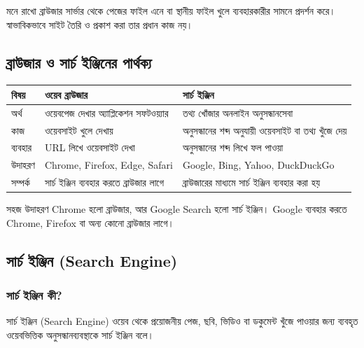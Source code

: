 \begin{boardbox}{মনে রাখো}
ব্রাউজার সার্ভার থেকে পেজের ফাইল এনে বা স্থানীয় ফাইল খুলে ব্যবহারকারীর সামনে প্রদর্শন করে। স্বাভাবিকভাবে সাইট তৈরি ও প্রকাশ করা তার প্রধান কাজ নয়।
\end{boardbox}

\subsection{ব্রাউজার ও সার্চ ইঞ্জিনের পার্থক্য}

\begin{center}
\begin{tabular}{|p{}|p{}|p{}|}
\hline
\textbf{বিষয়} & \textbf{ওয়েব ব্রাউজার} & \textbf{সার্চ ইঞ্জিন} \\
\hline
অর্থ & ওয়েবপেজ দেখার অ্যাপ্লিকেশন সফটওয়্যার & তথ্য খোঁজার অনলাইন অনুসন্ধানসেবা \\
\hline
কাজ & ওয়েবসাইট খুলে দেখায় & অনুসন্ধানের শব্দ অনুযায়ী ওয়েবসাইট বা তথ্য খুঁজে দেয় \\
\hline
ব্যবহার & URL লিখে ওয়েবসাইট দেখা & অনুসন্ধানের শব্দ লিখে ফল পাওয়া \\
\hline
উদাহরণ & Chrome, Firefox, Edge, Safari & Google, Bing, Yahoo, DuckDuckGo \\
\hline
সম্পর্ক & সার্চ ইঞ্জিন ব্যবহার করতে ব্রাউজার লাগে & ব্রাউজারের মাধ্যমে সার্চ ইঞ্জিন ব্যবহার করা হয় \\
\hline
\end{tabular}
\end{center}

\begin{examplebox}{সহজ উদাহরণ}
Chrome হলো ব্রাউজার, আর Google Search হলো সার্চ ইঞ্জিন। Google ব্যবহার করতে Chrome, Firefox বা অন্য কোনো ব্রাউজার লাগে।
\end{examplebox}

\subsection{সার্চ ইঞ্জিন (Search Engine)}

\subsubsection{সার্চ ইঞ্জিন কী?}

\begin{definitionbox}{সার্চ ইঞ্জিন (Search Engine)}
ওয়েব থেকে প্রয়োজনীয় পেজ, ছবি, ভিডিও বা ডকুমেন্ট খুঁজে পাওয়ার জন্য ব্যবহৃত ওয়েবভিত্তিক অনুসন্ধানব্যবস্থাকে সার্চ ইঞ্জিন বলে।
\end{definitionbox}


